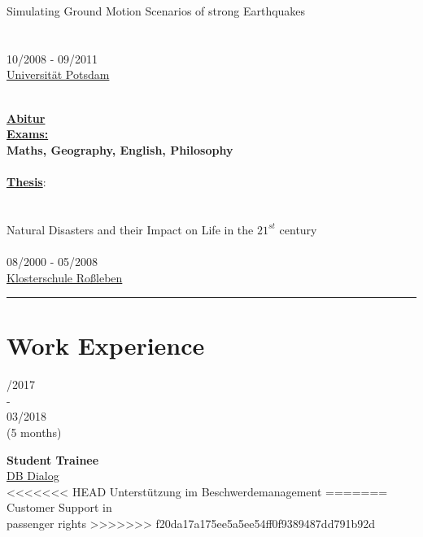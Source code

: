 \documentclass{article}
\begin{document}
\begin{minipage}[t]{0.69\textwidth}
\begin{minipage}{0.34\textwidth}
\begin{minipage}[t]{0.7\textwidth}
\begin{minipage}[t]{0.33\textwidth}
	Simulating Ground Motion Scenarios of strong Earthquakes\\\\\\
	{10/2008 - 09/2011}\\
\href{https://www.uni-potsdam.de/}{\color{pblue}Universität Potsdam}\\\\
		\end{minipage}
		\hfill
		\begin{minipage}[t]{0.25\textwidth}
	\textbf{\large \href{https://www.dropbox.com/s/nsgmvy7o64xb9si/Abiturzeugnis.pdf?dl=0}{\color{pblue}\faGraduationCap\hspace{1mm}Abitur}}\\
	\textbf{\underline{Exams:}}\\
	\textbf{Maths, Geography, English, Philosophy}\\\\
	\textbf{\underline{Thesis}}:\\
	 \\\\
	  Natural Disasters and their Impact on Life in the  $21^{st}$ century\\\\
	 08/2000 - 05/2008\\
	 \href{https://www.klosterschule.de/}{\color{pblue}Klosterschule Roßleben}
		\end{minipage}
		\vspace{-5mm}
		\hrule
		\vspace{-1mm}
		\section*{\fontsize{18pt}{24pt}\selectfont \color{pblue} Work Experience}
		
		\begin{minipage}[t]{0.52\textwidth}
		\begin{minipage}[t]{0.25\textwidth}
		/2017\\ -\\ 03/2018\\(5 months)
		\end{minipage}
		\hfill
		\begin{minipage}[t]{0.75\textwidth}
		\textbf{Student Trainee}\\ \href{https://assecor.de/}{\color{pblue}DB Dialog}\\
<<<<<<< HEAD
	    Unterstützung im Beschwerdemanagement
=======
	    Customer Support in\\ passenger rights
>>>>>>> f20da17a175ee5a5ee54ff0f9389487dd791b92d
		\end{minipage}
		

\end{minipage}
\end{minipage}
\end{minipage}
\end{minipage}
\end{document}
